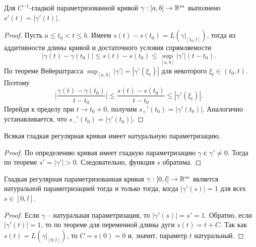 \begin{theorem}
    Для $C^{-1}$-гладкой параметризованной кривой $\gamma: [a, b] \to \mathbb{R}^m$ выполнено $s'(t) = |\gamma'(t)|$.
\end{theorem}

\begin{proof}
    Пусть $a \leq t_{0} < t \leq b$. Имеем $s(t) - s(t_{0}) = L(\gamma|_{[t_{0}, t]})$, тогда из аддитивности длины кривой и достаточного условия спрямляемости
    \[|\gamma(t) - \gamma(t_{0})| \leq s(t) - s(t_{0}) \leq \sup_{[a, b]} |\gamma'|(t - t_{0}).\]
    По теореме Вейерштрасса $\sup_{[a, b]} |\gamma'| = |\gamma'(\xi_{t})|$ для некоторого $\xi_{t} \in (t_{0}, t)$. Поэтому 
    \[\lvert\frac{\gamma(t) - \gamma(t_{0})}{t - t_{0}}\rvert \leq \frac{s(t) - s(t_{0})}{t - t_{0}} \leq |\gamma'(\xi_{t})|.\]
    Перейдя к пределу при $t \to t_{0} + 0$, получим $s_{+}'(t_{0}) = |\gamma'(t_{0})|$. Аналогично устанавливается, что $s_{-}'(t_{0}) = |\gamma'(t_{0})|$.
\end{proof}

\begin{corollary}
    Всякая гладкая регулярная кривая имеет натуральную параметризацию.
\end{corollary}

\begin{proof}
    По определению кривая имеет гладкую параметризацию $\gamma$ с $\gamma' \neq 0$. Тогда по теореме $s' = |\gamma'| > 0$. Следовательно, функция $s$ обратима.
\end{proof}

\begin{corollary}
    Гладкая регулярная параметризованная кривая $\gamma: [0, l] \to \mathbb{R}^m$ является натуральной параметризацией тогда и только тогда, когда $|\gamma'(s)| = 1$ для всех $s \in [0, l]$.
\end{corollary}

\begin{proof}
    Если $\gamma$ -- натуральная параметризация, то $|\gamma'(s)| = s' = 1$. Обратно, если $|\gamma'(t)| = 1$, то по теореме для переменной длины дуги $s(t) = t + C$. Так как $s(t) = L(\gamma|_{[0, t]})$, то $C = s(0) = 0$ и, значит, параметр $t$ натуральный.
\end{proof}